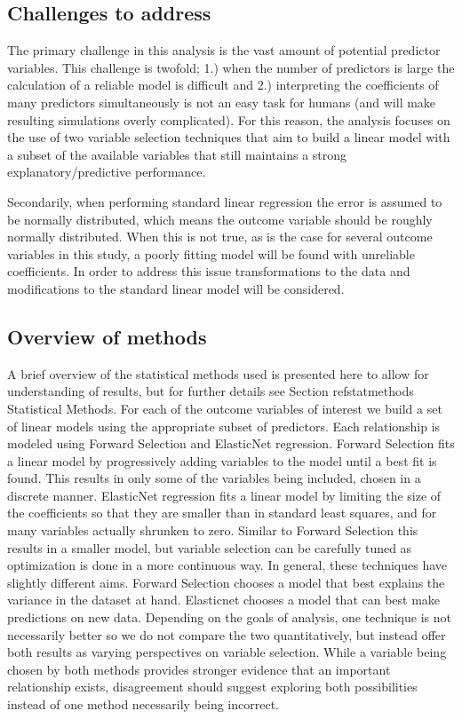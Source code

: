 \documentclass{article}
\begin{document}
\subsection{Challenges to address}

The primary challenge in this analysis is the vast amount of potential predictor variables. This challenge is twofold; 1.) when 
the number of predictors is large the calculation of a reliable model is difficult and 2.) interpreting the coefficients of many 
predictors simultaneously is not an easy task for humans (and will make resulting simulations overly complicated). For this 
reason, the analysis focuses on the use of two variable selection techniques that aim to build a linear model with a subset of 
the available variables that still maintains a strong explanatory/predictive performance.

Secondarily, when performing standard linear regression the error is assumed to be normally 
distributed, which means the outcome variable should be roughly normally distributed. When this is not true, as is the case for 
several outcome variables in this study, a poorly fitting model will be found with unreliable coefficients. In order to address this 
issue transformations to the data and modifications to the standard linear model will be considered.

\subsection{Overview of methods}

A brief overview of the statistical methods used is presented here to allow for understanding of results, 
but for further details see Section refstatmethods Statistical Methods. For each of the outcome variables of interest 
we build a set of linear models using the appropriate subset of predictors. Each relationship is modeled 
using Forward Selection and ElasticNet regression. Forward Selection fits a linear model by progressively adding variables to 
the model until a best fit is found. This results in only some of the variables being included, chosen in a discrete manner. 
ElasticNet regression fits a linear model by limiting the size of the coefficients so that they are smaller than in standard least 
squares, and for many variables actually shrunken to zero. Similar to Forward Selection this results in a smaller model, but 
variable selection can be carefully tuned as optimization is done in a more continuous way. In general, these techniques have 
slightly different aims. Forward Selection chooses a model that best explains the variance in the dataset at hand. Elasticnet 
chooses a model that can best make predictions on new data. Depending on the goals of analysis, one technique is not 
necessarily better so we do not compare the two quantitatively, but instead offer both results as varying perspectives on 
variable selection. While a variable being chosen by both methods provides stronger evidence that an important relationship exists, disagreement should suggest exploring both possibilities instead of one method necessarily being incorrect.
\end{document}
